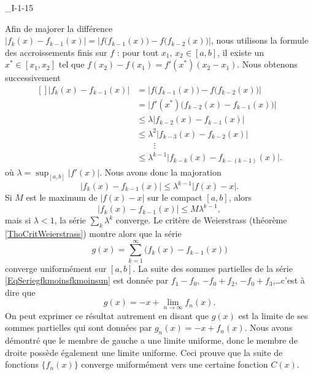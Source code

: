

\begin{corrige}{_I-1-15}

Afin de majorer la différence $| f_k(x)-f_{k-1}(x) |=| f\big( f_{k-1}(x) \big)-f\big( f_{k-2}(x) \big) |$, nous utilisons la formule des accroissements finis sur $f$ : pour tout $x_1$, $x_2\in[a,b]$, il existe un $x^*\in[x_1,x_2]$ tel que $f(x_2)-f(x_1)=f'(x^*)(x_2-x_1)$. Nous obtenons successivement 
\begin{equation}
	\begin{aligned}[]
		| f_k(x)-f_{k-1}(x) |	&=	\Big| f\big( f_{k-1}(x) \big)-f\big( f_{k-2}(x) \big) \Big|\\
					&=	\Big| f'(x^*)\big( f_{k-2}(x)-f_{k-1}(x) \big)  \Big|\\
					&\leq	\lambda\big| f_{k-2}(x)-f_{k-1}(x) \big|\\
					&\leq	\lambda^2\big| f_{k-3}(x)-f_{k-2}(x) \big|\\
					&\qquad\vdots	\\
					&\leq	\lambda^{k-1}\big| f_{k-k}(x)-f_{k-(k-1)}(x) \big|.
	\end{aligned}
\end{equation}
où $\lambda=\sup_{[a,b]}| f'(x) |$. Nous avons donc la majoration
\begin{equation}
	| f_k(x)-f_{k-1}(x)|\leq \lambda^{k-1}| f(x)-x |.
\end{equation}
Si $M$ est le maximum de $| f(x)-x |$ sur le compact $[a,b]$, alors
\begin{equation}
	| f_k(x)-f_{k-1}(x)|\leq M\lambda^{k-1},
\end{equation}
mais si $\lambda<1$, la série $\sum_k\lambda^k$ converge. Le critère de Weierstrass (théorème \ref{ThoCritWeierstrass}) montre alors que la série
\begin{equation}		\label{EqSeriegfkmoinsfkmoinsun}
	g(x)=\sum_{k=1}^{\infty}\big( f_k(x)-f_{k-1}(x) \big)
\end{equation}
converge uniformément sur $[a,b]$. La suite des sommes partielles de la série \eqref{EqSeriegfkmoinsfkmoinsun} est donnée par $f_1-f_0$, $-f_0+f_2$, $-f_0+f_3$,\ldots c'est à dire que
\begin{equation}
	g(x)=-x+\lim_{n\to\infty}f_n(x).
\end{equation}
On peut exprimer ce résultat autrement en disant que $g(x)$ est la limite de ses sommes partielles qui sont données par $g_n(x)=-x+f_n(x)$. Nous avons démontré que le membre de gauche a une limite uniforme, donc le membre de droite possède également une limite uniforme. Ceci prouve que la suite de fonctions $\{ f_n(x) \}$ converge uniformément vers une certaine fonction $C(x)$.


\end{corrige}
